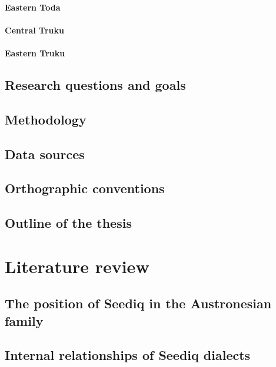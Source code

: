 \documentclass[master]{NTHUthesis}
\begin{document}
\subsubsection{Eastern Toda}
\lipsum[1]

\subsubsection{Central Truku}
\lipsum[1]

\subsubsection{Eastern Truku}
\lipsum[1]

\lipsum[1]

\section{Research questions and goals}
\lipsum[1-4]

\section{Methodology}
\lipsum[1-7]

\section{Data sources}
\lipsum[1-3]

\section{Orthographic conventions}
\lipsum[1-5]

\section{Outline of the thesis}
\lipsum[1-2]

\chapter{Literature review}
\lipsum[1]

\section{The position of Seediq in the Austronesian family}
\lipsum[1-5]

\section{Internal relationships of Seediq dialects}
\lipsum[1-5]
\end{document}
